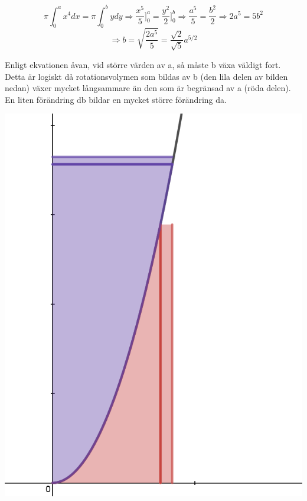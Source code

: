 \documentclass[a4paper,12pt]{article}
\begin{document}
\begin{enumerate}
    $$\pi\int_0^ax^4dx=\pi\int_0^bydy\Rightarrow \frac{x^5}{5}]_0^a=\frac{y^2}{2}]_0^b\Rightarrow \frac{a^5}{5}=\frac{b^2}{2}\Rightarrow 2a^5=5b^2$$
    $$\Rightarrow b=\sqrt{\frac{2a^5}{5}}=\frac{\sqrt{2}}{\sqrt{5}}a^{5/2}$$

    Enligt ekvationen åvan, vid större värden av a, så måste b växa
    väldigt fort. Detta är logiskt då rotationsvolymen som bildas
    av b (den lila delen av bilden nedan) växer mycket långsammare 
    än den som är begränsad av a (röda delen). En liten förändring
    db bildar en mycket större förändring da. 

    \begin{center}
        \includegraphics[scale=0.35]{Figur 7.png}
    \end{center}


\end{enumerate}
\end{document}
